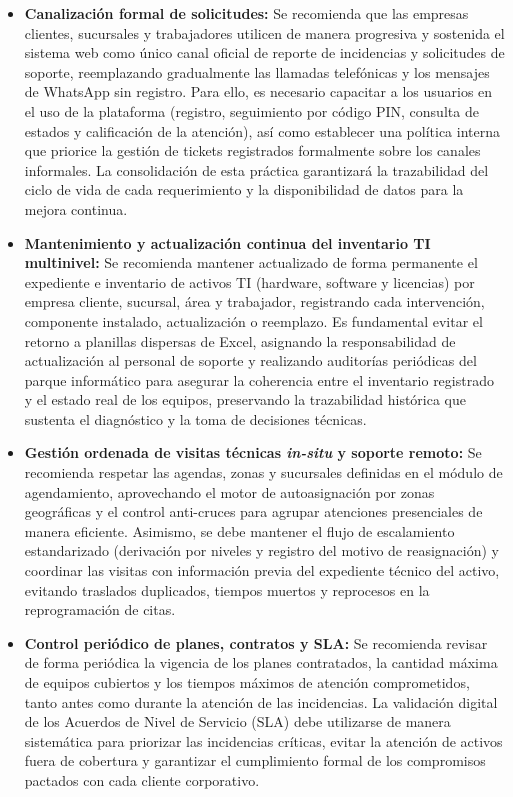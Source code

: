 \begin{itemize}[leftmargin=1.27cm]
    \item \textbf{Canalización formal de solicitudes:} Se recomienda que las empresas clientes, sucursales y trabajadores utilicen de manera progresiva y sostenida el sistema web como único canal oficial de reporte de incidencias y solicitudes de soporte, reemplazando gradualmente las llamadas telefónicas y los mensajes de WhatsApp sin registro. Para ello, es necesario capacitar a los usuarios en el uso de la plataforma (registro, seguimiento por código PIN, consulta de estados y calificación de la atención), así como establecer una política interna que priorice la gestión de tickets registrados formalmente sobre los canales informales. La consolidación de esta práctica garantizará la trazabilidad del ciclo de vida de cada requerimiento y la disponibilidad de datos para la mejora continua.

    \item \textbf{Mantenimiento y actualización continua del inventario TI multinivel:} Se recomienda mantener actualizado de forma permanente el expediente e inventario de activos TI (hardware, software y licencias) por empresa cliente, sucursal, área y trabajador, registrando cada intervención, componente instalado, actualización o reemplazo. Es fundamental evitar el retorno a planillas dispersas de Excel, asignando la responsabilidad de actualización al personal de soporte y realizando auditorías periódicas del parque informático para asegurar la coherencia entre el inventario registrado y el estado real de los equipos, preservando la trazabilidad histórica que sustenta el diagnóstico y la toma de decisiones técnicas.

    \item \textbf{Gestión ordenada de visitas técnicas \textit{in-situ} y soporte remoto:} Se recomienda respetar las agendas, zonas y sucursales definidas en el módulo de agendamiento, aprovechando el motor de autoasignación por zonas geográficas y el control anti-cruces para agrupar atenciones presenciales de manera eficiente. Asimismo, se debe mantener el flujo de escalamiento estandarizado (derivación por niveles y registro del motivo de reasignación) y coordinar las visitas con información previa del expediente técnico del activo, evitando traslados duplicados, tiempos muertos y reprocesos en la reprogramación de citas.

    \item \textbf{Control periódico de planes, contratos y SLA:} Se recomienda revisar de forma periódica la vigencia de los planes contratados, la cantidad máxima de equipos cubiertos y los tiempos máximos de atención comprometidos, tanto antes como durante la atención de las incidencias. La validación digital de los Acuerdos de Nivel de Servicio (SLA) debe utilizarse de manera sistemática para priorizar las incidencias críticas, evitar la atención de activos fuera de cobertura y garantizar el cumplimiento formal de los compromisos pactados con cada cliente corporativo.


\end{itemize}
